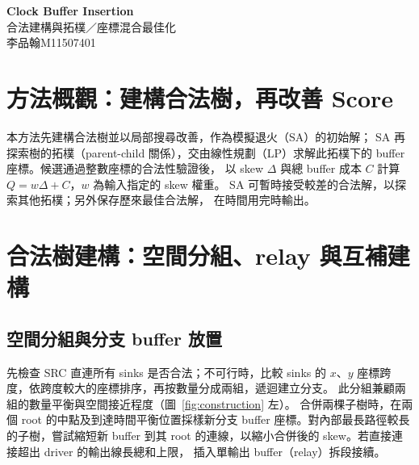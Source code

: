 \documentclass[12pt,a4paper]{article}
\newcommand{\rDelta}{\Delta}
\newcommand{\rScore}{Q}
\newcommand{\rCost}{C}
\begin{document}
\begin{center}
  {\LARGE\bfseries Clock Buffer Insertion}\\[-1pt]
  {\large 合法建構與拓樸／座標混合最佳化}\\[3pt]
  李品翰\quad M11507401
\end{center}
\vspace{-5pt}

\section{方法概觀：建構合法樹，再改善 Score}
本方法先建構合法樹並以局部搜尋改善，作為模擬退火（SA）的初始解；
SA 再探索樹的拓樸（parent-child 關係），交由線性規劃（LP）求解此拓樸下的
buffer 座標。候選通過整數座標的合法性驗證後，
以 skew $\rDelta$ 與總 buffer 成本 $\rCost$ 計算
$\rScore=w\rDelta+\rCost$，$w$ 為輸入指定的 skew 權重。
SA 可暫時接受較差的合法解，以探索其他拓樸；另外保存歷來最佳合法解，
在時間用完時輸出。

\section{合法樹建構：空間分組、relay 與互補建構}
\subsection{空間分組與分支 buffer 放置}
先檢查 SRC 直連所有 sinks 是否合法；不可行時，比較 sinks 的 $x$、$y$
座標跨度，依跨度較大的座標排序，再按數量分成兩組，遞迴建立分支。
此分組兼顧兩組的數量平衡與空間接近程度（圖~\ref{fig:construction} 左）。
合併兩棵子樹時，在兩個 root 的中點及到達時間平衡位置採樣新分支
buffer 座標。對內部最長路徑較長的子樹，嘗試縮短新 buffer 到其 root
的連線，以縮小合併後的 skew。若直接連接超出 driver 的輸出線長總和上限，
插入單輸出 buffer（relay）拆段接續。
\end{document}
